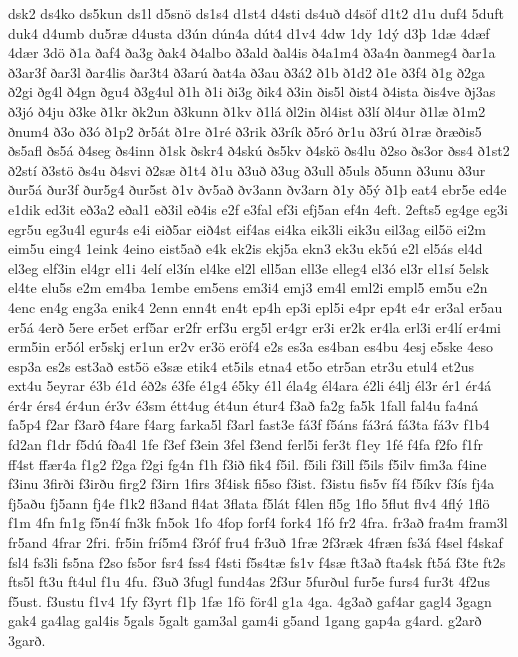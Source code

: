 {dsk2
ds4ko
ds5kun
ds1l
d5snö
ds1s4
d1st4
d4sti
ds4uð
d4söf
d1t2
d1u
duf4
5duft
duk4
d4umb
du5ræ
d4usta
d3ún
dún4a
dút4
d1v4
4dw
1dy
1dý
d3þ
1dæ
4dæf
4dær
3dö
ð1a
ðaf4
ða3g
ðak4
ð4albo
ð3ald
ðal4is
ð4a1m4
ð3a4n
ðanmeg4
ðar1a
ð3ar3f
ðar3l
ðar4lis
ðar3t4
ð3arú
ðat4a
ð3au
ð3á2
ð1b
ð1d2
ð1e
ð3f4
ð1g
ð2ga
ð2gi
ðg4l
ð4gn
ðgu4
ð3g4ul
ð1h
ð1i
ði3g
ðik4
ð3in
ðis5l
ðist4
ð4ista
ðis4ve
ðj3as
ð3jó
ð4ju
ð3ke
ð1kr
ðk2un
ð3kunn
ð1kv
ð1lá
ðl2in
ðl4ist
ð3lí
ðl4ur
ð1læ
ð1m2
ðnum4
ð3o
ð3ó
ð1p2
ðr5át
ð1re
ð1ré
ð3rik
ð3rík
ð5ró
ðr1u
ð3rú
ð1ræ
ðræðis5
ðs5afl
ðs5á
ð4seg
ðs4inn
ð1sk
ðskr4
ð4skú
ðs5kv
ð4skö
ðs4lu
ð2so
ðs3or
ðss4
ð1st2
ð2stí
ð3stö
ðs4u
ð4svi
ð2sæ
ð1t4
ð1u
ð3uð
ð3ug
ð3ull
ð5uls
ð5unn
ð3unu
ð3ur
ður5á
ður3f
ður5g4
ður5st
ð1v
ðv5að
ðv3ann
ðv3arn
ð1y
ð5ý
ð1þ
eat4
ebr5e
ed4e
e1dik
ed3it
eð3a2
eðal1
eð3il
eð4is
e2f
e3fal
ef3i
efj5an
ef4n
4eft.
2efts5
eg4ge
eg3i
egr5u
eg3u4l
egur4s
e4i
eið5ar
eið4st
eif4as
ei4ka
eik3li
eik3u
eil3ag
eil5ö
ei2m
eim5u
eing4
1eink
4eino
eist5að
e4k
ek2is
ekj5a
ekn3
ek3u
ek5ú
e2l
el5ás
el4d
el3eg
elf3in
el4gr
el1i
4elí
el3ín
el4ke
el2l
ell5an
ell3e
elleg4
el3ó
el3r
el1sí
5elsk
el4te
elu5s
e2m
em4ba
1embe
em5ens
em3i4
emj3
em4l
eml2i
empl5
em5u
e2n
4enc
en4g
eng3a
enik4
2enn
enn4t
en4t
ep4h
ep3i
epl5i
e4pr
ep4t
e4r
er3al
er5au
er5á
4erð
5ere
er5et
erf5ar
er2fr
erf3u
erg5l
er4gr
er3i
er2k
er4la
erl3i
er4lí
er4mi
erm5in
er5ól
er5skj
er1un
er2v
er3ö
eröf4
e2s
es3a
es4ban
es4bu
4esj
e5ske
4eso
esp3a
es2s
est3að
est5ö
e3sæ
etik4
et5ils
etna4
et5o
etr5an
etr3u
etul4
et2us
ext4u
5eyrar
é3b
é1d
éð2s
é3fe
é1g4
é5ky
é1l
éla4g
él4ara
é2li
é4lj
él3r
ér1
ér4á
ér4r
érs4
ér4un
ér3v
é3sm
étt4ug
ét4un
étur4
f3að
fa2g
fa5k
1fall
fal4u
fa4ná
fa5p4
f2ar
f3arð
f4are
f4arg
farka5l
f3arl
fast3e
fá3f
f5áns
fá3rá
fá3ta
fá3v
f1b4
fd2an
f1dr
f5dú
fða4l
1fe
f3ef
f3ein
3fel
f3end
ferl5i
fer3t
f1ey
1fé
f4fa
f2fo
f1fr
ff4st
ffær4a
f1g2
f2ga
f2gi
fg4n
f1h
f3ið
fik4
f5il.
f5ili
f3ill
f5ils
f5ilv
fim3a
f4ine
f3inu
3firði
f3irðu
firg2
f3irn
1firs
3f4isk
fi5so
f3ist.
f3istu
fis5v
fí4
f5íkv
f3ís
fj4a
fj5aðu
fj5ann
fj4e
f1k2
fl3and
fl4at
3flata
f5lát
f4len
fl5g
1flo
5flut
flv4
4flý
1flö
f1m
4fn
fn1g
f5n4í
fn3k
fn5ok
1fo
4fop
forf4
fork4
1fó
fr2
4fra.
fr3að
fra4m
fram3l
fr5and
4frar
2fri.
fr5in
frí5m4
f3róf
fru4
fr3uð
1fræ
2f3ræk
4fræn
fs3á
f4sel
f4skaf
fsl4
fs3li
fs5na
f2so
fs5or
fsr4
fss4
f4sti
f5s4tæ
fs1v
f4sæ
ft3að
fta4sk
ft5á
f3te
ft2s
fts5l
ft3u
ft4ul
f1u
4fu.
f3uð
3fugl
fund4as
2f3ur
5furðul
fur5e
furs4
fur3t
4f2us
f5ust.
f3ustu
f1v4
1fy
f3yrt
f1þ
1fæ
1fö
för4l
g1a
4ga.
4g3að
gaf4ar
gagl4
3gagn
gak4
ga4lag
gal4is
5gals
5galt
gam3al
gam4i
g5and
1gang
gap4a
g4ard.
g2arð
3garð.
}
